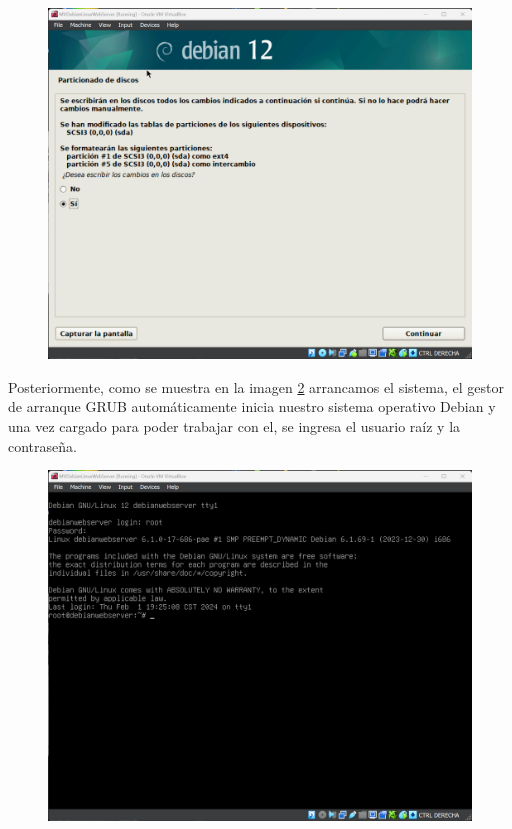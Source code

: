 \documentclass[12pt,a4paper]{article}
\begin{document}
\begin{figure}[H]
    \centering
    \includegraphics[width=1\linewidth]{M3_Virtualización_y_Contenedores/Tarea_2_Máquina_Virtual_Local/reporte/figuras/3-2_Máquina_Virtual_de_Debian.png}
    \label{fig:Instalación_Debian_2}
\end{figure}

\vspace{1em}

Posteriormente, como se muestra en la imagen \ref{fig:Instalación_Debian_3} arrancamos el sistema, el gestor de arranque GRUB automáticamente inicia nuestro sistema operativo Debian y una vez cargado para poder trabajar con el, se ingresa el usuario raíz y la contraseña.

\begin{figure}[H]
    \centering
    \includegraphics[width=1\linewidth]{M3_Virtualización_y_Contenedores/Tarea_2_Máquina_Virtual_Local/reporte/figuras/3-3_Máquina_Virtual_de_Debian.png}
    \label{fig:Instalación_Debian_3}
\end{figure}
\end{document}
